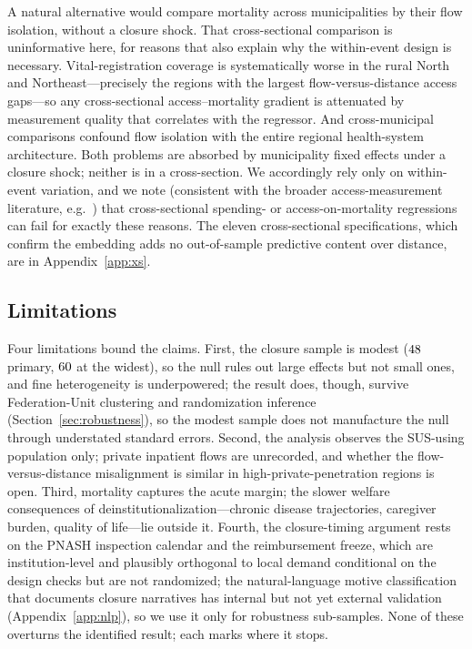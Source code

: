 A natural alternative would compare mortality across municipalities by
their flow isolation, without a closure shock. That cross-sectional
comparison is uninformative here, for reasons that also explain why the
within-event design is necessary. Vital-registration coverage is
systematically worse in the rural North and Northeast---precisely the
regions with the largest flow-versus-distance access gaps---so any
cross-sectional access--mortality gradient is attenuated by measurement
quality that correlates with the regressor. And cross-municipal
comparisons confound flow isolation with the entire regional
health-system architecture. Both problems are absorbed by municipality
fixed effects under a closure shock; neither is in a cross-section. We
accordingly rely only on within-event variation, and we note (consistent
with the broader access-measurement literature, e.g.\
\citealp{doyle2011}) that cross-sectional spending- or
access-on-mortality regressions can fail for exactly these reasons. The
eleven cross-sectional specifications, which confirm the embedding adds
no out-of-sample predictive content over distance, are in
Appendix~\ref{app:xs}.

\subsection{Limitations}
\label{sec:discussion-limits}

Four limitations bound the claims. First, the closure sample is modest
($48$ primary, $60$ at the widest), so the null rules out large effects
but not small ones, and fine heterogeneity is underpowered; the result
does, though, survive Federation-Unit clustering and randomization
inference (Section~\ref{sec:robustness}), so the modest sample does not
manufacture the null through understated standard errors. Second, the
analysis observes the SUS-using population only; private inpatient flows
are unrecorded, and whether the flow-versus-distance misalignment is
similar in high-private-penetration regions is open. Third, mortality
captures the acute margin; the slower welfare consequences of
deinstitutionalization---chronic disease trajectories, caregiver burden,
quality of life---lie outside it. Fourth, the closure-timing argument
rests on the PNASH inspection calendar and the reimbursement freeze,
which are institution-level and plausibly orthogonal to local demand
conditional on the design checks but are not randomized; the
natural-language motive classification that documents closure narratives
has internal but not yet external validation (Appendix~\ref{app:nlp}), so we use it only for
robustness sub-samples. None of these overturns the identified result;
each marks where it stops.
